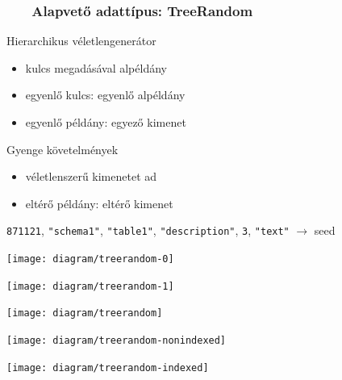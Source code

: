 \documentclass[
    aspectratio=169,
]{beamer}
\newcommand{\slidetitle}[2]{\frametitle{{\small #1 ~ \ding{226} ~ } \normalsize \textbf{#2} }}
\begin{document}
\begin{frame}
    \slidetitle{\sectionshorttitle}{Alapvető adattípus: TreeRandom}
    
    \begin{minipage}[c]{0.5\textwidth}
        \vspace{0.5em}
        
        {\color{beamer@blendedblue}Hierarchikus véletlengenerátor}
        
        \vspace{0.2cm}
        
        \begin{itemize}
            \item kulcs megadásával alpéldány
            \item egyenlő kulcs: egyenlő alpéldány
            \item egyenlő példány: egyező kimenet
        \end{itemize}

        \vspace{0.7cm}
        
        {\color{beamer@blendedblue}Gyenge követelmények}

        \vspace{0.2cm}
        
        \begin{itemize}
            \item véletlenszerű kimenetet ad
            \item eltérő példány: eltérő kimenet
        \end{itemize}

        \begin{overprint}
            \begin{flushright}
                \vspace{2.5em}
                
                { \tiny \color{BrickRed}
                    \texttt{871121}{\color{RoyalPurple},}%
                    \texttt{"schema1"}{\color{RoyalPurple},}%
                    \texttt{"table1"}{\color{RoyalPurple},}%
                    \texttt{"description"}{\color{RoyalPurple},}%
                    \texttt{3}{\color{RoyalPurple},}%
                    \texttt{"text"} {\color{RoyalPurple}$\rightarrow$}
                    seed
                }
            \end{flushright}
        \end{overprint}
    \end{minipage}%
    \begin{minipage}[c]{0.5\textwidth}
        \begin{overprint}
            \centerline{\texttt{[image: diagram/treerandom-0]}}
            \centerline{\texttt{[image: diagram/treerandom-1]}}
            \centerline{\texttt{[image: diagram/treerandom]}}
            \centerline{\texttt{[image: diagram/treerandom-nonindexed]}}
            \centerline{\texttt{[image: diagram/treerandom-indexed]}}
        \end{overprint}
    \end{minipage}
\end{frame}
\end{document}
